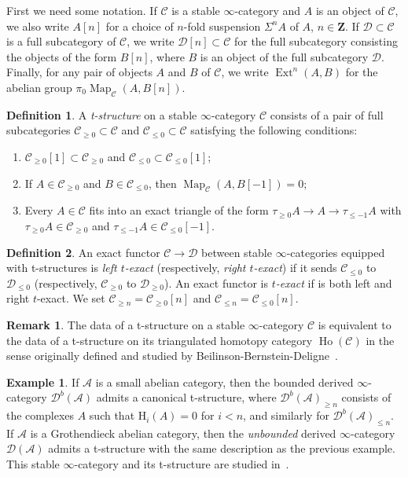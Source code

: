 \documentclass[12pt]{article}
\theoremstyle{definition}
\newtheorem{definition}{Definition}[subsection]
\newtheorem{example}{Example}[subsection]
\newtheorem{remark}{Remark}[subsection]
\newcommand{\A}{\mathcal{A}}
\newcommand{\C}{\mathcal{C}}
\newcommand{\D}{\mathcal{D}}
\newcommand{\ZZ}{\mathbf{Z}}
\renewcommand{\i}{\infty}
\DeclareMathOperator{\Ext}{Ext}
\DeclareMathOperator{\Ho}{Ho}
\DeclareMathOperator{\Map}{Map}
\begin{document}
First we need some notation.
If $\C$ is a stable $\infty$-category and $A$ is an object of $\C$, we also write
$A[n]$ for a choice of $n$-fold suspension $\Sigma^n A$ of $A$, $n\in\ZZ$. If $\D\subset\C$ is a
full subcategory of $\C$, we write $\D[n]\subset\C$ for the full subcategory
consisting the objects of the form $B[n]$, where $B$ is an object of the full subcategory $\D$.
Finally, for any pair of objects $A$ and $B$ of $\C$, we write $\Ext^n(A,B)$ for the abelian group $\pi_0\Map_{\C}(A,B[n])$.

\begin{definition}\label{def:t}
A {\em t-structure} on a stable $\infty$-category $\C$ consists of a pair of full subcategories $\C_{\geq 0}\subset \C$ and $\C_{\leq 0}\subset \C$ satisfying the following conditions:
\begin{enumerate}\itemsep.1em
\item[(1)]
$\C_{\geq 0}[1]\subset \C_{\geq 0}$ and $\C_{\leq 0}\subset \C_{\leq 0}[1]$;
\item[(2)]
If $A\in \C_{\geq 0}$ and $B\in \C_{\leq 0}$, then $\Map_\C(A,B[-1])=0$;
\item[(3)]   Every $A\in \C$ fits into an exact triangle of the form
$
\tau_{\geq 0}A\to A\to\tau_{\leq -1}A
$
with $\tau_{\geq 0}A\in\C_{\geq 0}$ and $\tau_{\leq -1}A\in \C_{\leq 0}[-1]$.
\end{enumerate}
\end{definition}
\begin{definition}
An exact functor $\C\rightarrow\D$ between stable $\infty$-categories equipped with t-structures is {\em left $t$-exact} (respectively, {\em right $t$-exact}) if it sends $\C_{\leq 0}$ to $\D_{\leq 0}$ (respectively, $\C_{\geq 0}$ to $\D_{\geq 0}$). An exact functor is {\em $t$-exact} if is both left and right $t$-exact. We set $\C_{\geq n}=\C_{\geq 0}[n]$ and $\C_{\leq n}=\C_{\leq 0}[n]$.
\end{definition}
\begin{remark}
The data of a t-structure on a stable $\i$-category $\C$ is equivalent to the data of a t-structure on its triangulated homotopy category $\Ho(\C)$ in the sense originally defined and studied by Beilinson-Bernstein-Deligne~\cite{bbd}.
\end{remark}
\begin{example}\label{ex:t}
If $\A$ is a small abelian category, then the bounded derived $\infty$-category $\D^b(\A)$\index{$\D^b(\A)$}  admits a canonical t-structure, where $\D^b(\A)_{\geq n}$ consists of the complexes $A$ such that $\mathrm{H}_i(A)=0$ for $i<n$, and similarly for $\D^b(\A)_{\leq n}$.
If $\A$ is a Grothendieck abelian category, then the {\em unbounded} derived $\infty$-category $\D(\A)$ admits a t-structure with the same description as the previous example.
This stable $\infty$-category and its t-structure are studied in~\cite[Section~1.3.5]{HA}.
\end{example}
\end{document}
